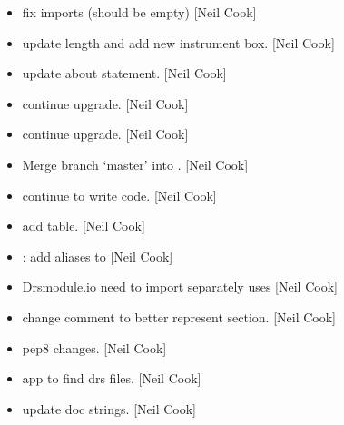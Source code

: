 \documentclass[a4paper,10pt,english]{report}
\begin{document}
\begin{itemize}
\item {} 
 \sphinxhyphen{} fix imports (should be empty) {[}Neil Cook{]}

\item {} 
 \sphinxhyphen{} update length and add new instrument box. {[}Neil
Cook{]}

\item {} 
 \sphinxhyphen{} update about statement. {[}Neil Cook{]}

\item {} 
 \sphinxhyphen{} continue upgrade. {[}Neil Cook{]}

\item {} 
 \sphinxhyphen{} continue upgrade. {[}Neil Cook{]}

\item {} 
Merge branch ‘master’ into . {[}Neil Cook{]}

\item {} 
 \sphinxhyphen{} continue to write code. {[}Neil Cook{]}

\item {} 
 \sphinxhyphen{} add table. {[}Neil Cook{]}

\item {} 
: add aliases to  {[}Neil Cook{]}

\item {} 
Drsmodule.io \sphinxhyphen{} need to import  separately  uses
 {[}Neil Cook{]}

\item {} 
 \sphinxhyphen{} change comment to better represent section. {[}Neil Cook{]}

\item {} 
 \sphinxhyphen{} pep8 changes. {[}Neil Cook{]}

\item {} 
 \sphinxhyphen{} app to find drs files. {[}Neil Cook{]}

\item {} 
 \sphinxhyphen{} update doc strings. {[}Neil Cook{]}


\end{itemize}
\end{document}

